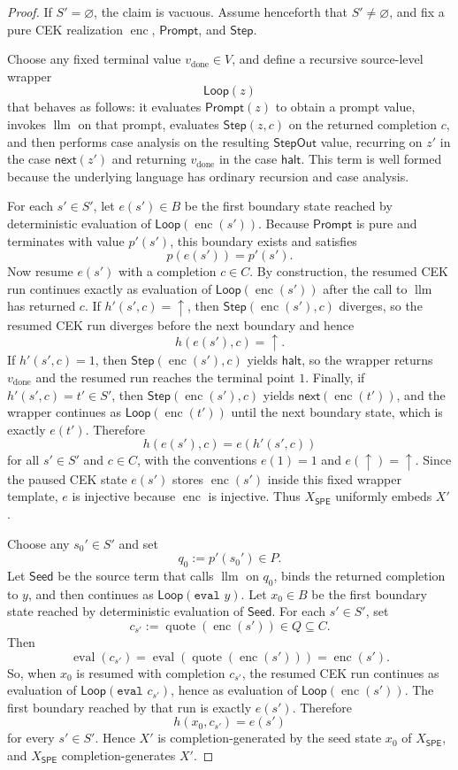 \documentclass[11pt]{article}
\newcommand{\SPE}{\mathsf{SPE}}
\newcommand{\eval}{\operatorname{eval}}
\newcommand{\quoteop}{\operatorname{quote}}
\newcommand{\enc}{\operatorname{enc}}
\newcommand{\llm}{\operatorname{llm}}
\begin{document}
\begin{proof}
If $S'=\varnothing$, the claim is vacuous. Assume henceforth that $S'\neq\varnothing$, and fix a pure CEK realization $\enc$, $\mathsf{Prompt}$, and $\mathsf{Step}$.

Choose any fixed terminal value $v_{\mathrm{done}}\in V$, and define a recursive source-level wrapper
\[
\mathsf{Loop}(z)
\]
that behaves as follows: it evaluates $\mathsf{Prompt}(z)$ to obtain a prompt value, invokes $\llm$ on that prompt, evaluates $\mathsf{Step}(z,c)$ on the returned completion $c$, and then performs case analysis on the resulting $\mathsf{StepOut}$ value, recurring on $z'$ in the case $\mathsf{next}(z')$ and returning $v_{\mathrm{done}}$ in the case $\mathsf{halt}$. This term is well formed because the underlying language has ordinary recursion and case analysis.

For each $s'\in S'$, let $e(s')\in B$ be the first boundary state reached by deterministic evaluation of $\mathsf{Loop}(\enc(s'))$. Because $\mathsf{Prompt}$ is pure and terminates with value $p'(s')$, this boundary exists and satisfies
\[
p(e(s'))=p'(s').
\]
Now resume $e(s')$ with a completion $c\in C$. By construction, the resumed CEK run continues exactly as evaluation of $\mathsf{Loop}(\enc(s'))$ after the call to $\llm$ has returned $c$. If $h'(s',c)=\uparrow$, then $\mathsf{Step}(\enc(s'),c)$ diverges, so the resumed CEK run diverges before the next boundary and hence
\[
h(e(s'),c)=\uparrow.
\]
If $h'(s',c)=1$, then $\mathsf{Step}(\enc(s'),c)$ yields $\mathsf{halt}$, so the wrapper returns $v_{\mathrm{done}}$ and the resumed run reaches the terminal point $1$. Finally, if $h'(s',c)=t'\in S'$, then $\mathsf{Step}(\enc(s'),c)$ yields $\mathsf{next}(\enc(t'))$, and the wrapper continues as $\mathsf{Loop}(\enc(t'))$ until the next boundary state, which is exactly $e(t')$. Therefore
\[
h(e(s'),c)=e(h'(s',c))
\]
for all $s'\in S'$ and $c\in C$, with the conventions $e(1)=1$ and $e(\uparrow)=\uparrow$. Since the paused CEK state $e(s')$ stores $\enc(s')$ inside this fixed wrapper template, $e$ is injective because $\enc$ is injective. Thus $X_{\SPE}$ uniformly embeds $X'$.

Choose any $s_0'\in S'$ and set
\[
q_0:=p'(s_0')\in P.
\]
Let $\mathsf{Seed}$ be the source term that calls $\llm$ on $q_0$, binds the returned completion to $y$, and then continues as $\mathsf{Loop}(\texttt{eval }y)$. Let $x_0\in B$ be the first boundary state reached by deterministic evaluation of $\mathsf{Seed}$. For each $s'\in S'$, set
\[
c_{s'}:=\quoteop(\enc(s'))\in Q\subseteq C.
\]
Then
\[
\eval(c_{s'})=\eval(\quoteop(\enc(s')))=\enc(s').
\]
So, when $x_0$ is resumed with completion $c_{s'}$, the resumed CEK run continues as evaluation of $\mathsf{Loop}(\texttt{eval }c_{s'})$, hence as evaluation of $\mathsf{Loop}(\enc(s'))$. The first boundary reached by that run is exactly $e(s')$. Therefore
\[
h(x_0,c_{s'})=e(s')
\]
for every $s'\in S'$. Hence $X'$ is completion-generated by the seed state $x_0$ of $X_{\SPE}$, and $X_{\SPE}$ completion-generates $X'$.
\end{proof}
\end{document}
